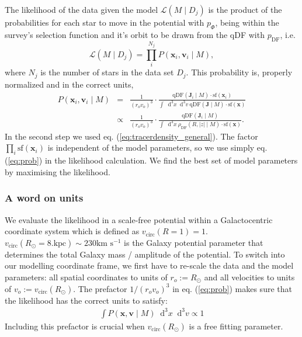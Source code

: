 \documentclass[12pt,preprint]{aastex}
\newcommand{\vect}[1]{\boldsymbol{#1}} %
\newcommand*\Diff[1]{\mathop{}\!\mathrm{d^#1}}
\begin{document}
The likelihood of the data given the model $\mathscr{L}(M \mid D_j)$ is the product of the probabilities for each star to move in the potential with $p_\Phi$, being within the survey's selection function and it's orbit to be drawn from the qDF with $p_\text{DF}$, i.e. 
\begin{equation}
\mathscr{L}(M \mid D_j) = \prod_i^{N_j} P(\vect{x}_i,\vect{v}_i \mid M), \label{eq:likelihood}
\end{equation}
where $N_j$ is the number of stars in the data set $D_j$. This probability is, properly normalized and in the correct units,
\begin{eqnarray}
P(\vect{x}_i,\vect{v}_i \mid M) &=& \frac{1}{\left(r_o v_o\right)^3} \cdot \frac{\text{qDF}(\vect{J}_i \mid M) \cdot \text{sf}(\vect{x}_i)}{\int \Diff 3 x \Diff 3 v \  \text{qDF}(\vect{J} \mid M) \cdot \text{sf}(\vect{x})}\nonumber\\
&\propto& \frac{1}{\left(r_o v_o\right)^3} \cdot \frac{\text{qDF}(\vect{J}_i \mid M)}{\int \Diff 3 x \  \rho_\text{DF}(R,|z| \mid M) \cdot \text{sf}(\vect{x})}. \label{eq:prob}
\end{eqnarray}
In the second step we used eq. (\ref{eq:tracerdensity_general}). The factor $\prod_i\text{sf}(\vect{x}_i)$ is independent of the model parameters, so we use simply eq. (\ref{eq:prob}) in the likelihood calculation. We find the best set of model parameters by maximising the likelihood. 


\subsubsection{A word on units}

We evaluate the likelihood in a scale-free potential within a Galactocentric coordinate system which is defined as $v_\text{circ}(R = 1) = 1$. $v_\text{circ}(R_\odot = 8. \text{kpc}) \sim 230 \text{km s$^{-1}$}$ is the Galaxy potential parameter that determines the total Galaxy mass / amplitude of the potential. To switch into our modelling coordinate frame, we first have to re-scale the data and the model parameters: all spatial coordinates to units of $r_o := R_\odot$ and all velocities to units of $v_o := v_\text{circ}(R_\odot )$. The prefactor $1/\left(r_o v_o\right)^3$ in eq. (\ref{eq:prob}) makes sure that the likelihood has the correct units to satisfy:
\begin{eqnarray*}
\int P(\vect{x},\vect{v} \mid M) \Diff 3 x \Diff 3 v \propto 1
\end{eqnarray*} 
Including this prefactor is crucial when $v_\text{circ}(R_\odot )$ is a free fitting parameter.
\end{document}
